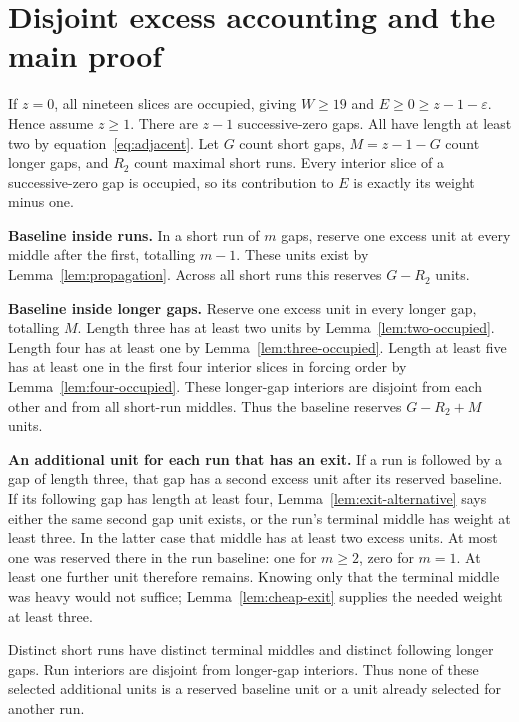 \documentclass{article}
\begin{document}
\section{Disjoint excess accounting and the main proof}\label{sec:accounting}

If \(z = 0\), all nineteen slices are occupied, giving \(W \ge 19\) and
\(E \ge 0 \ge z - 1 - \varepsilon\). Hence assume \(z \ge 1\). There are \(z - 1\)
successive-zero gaps. All have length at least two by equation~\eqref{eq:adjacent}. Let \(G\)
count short gaps, \(M = z - 1 - G\) count longer gaps, and \(R_2\) count maximal short runs.
Every interior slice of a successive-zero gap is occupied, so its contribution to \(E\) is
exactly its weight minus one.

\textbf{Baseline inside runs.} In a short run of \(m\) gaps, reserve one excess unit at every
middle after the first, totalling \(m - 1\). These units exist by
Lemma~\ref{lem:propagation}. Across all short runs this reserves \(G - R_2\) units.

\textbf{Baseline inside longer gaps.} Reserve one excess unit in every longer gap, totalling
\(M\). Length three has at least two units by Lemma~\ref{lem:two-occupied}. Length four has at
least one by Lemma~\ref{lem:three-occupied}. Length at least five has at least one in the
first four interior slices in forcing order by Lemma~\ref{lem:four-occupied}. These
longer-gap interiors are disjoint from each other and from all short-run middles. Thus the
baseline reserves \(G - R_2 + M\) units.

\textbf{An additional unit for each run that has an exit.} If a run is followed by a gap of
length three, that gap has a second excess unit after its reserved baseline. If its following
gap has length at least four, Lemma~\ref{lem:exit-alternative} says either the same second gap
unit exists, or the run's terminal middle has weight at least three. In the latter case that
middle has at least two excess units. At most one was reserved there in the run baseline: one
for \(m \ge 2\), zero for \(m = 1\). At least one further unit therefore remains. Knowing only
that the terminal middle was heavy would not suffice; Lemma~\ref{lem:cheap-exit} supplies the
needed weight at least three.

Distinct short runs have distinct terminal middles and distinct following longer gaps. Run
interiors are disjoint from longer-gap interiors. Thus none of these selected additional units
is a reserved baseline unit or a unit already selected for another run.
\end{document}
